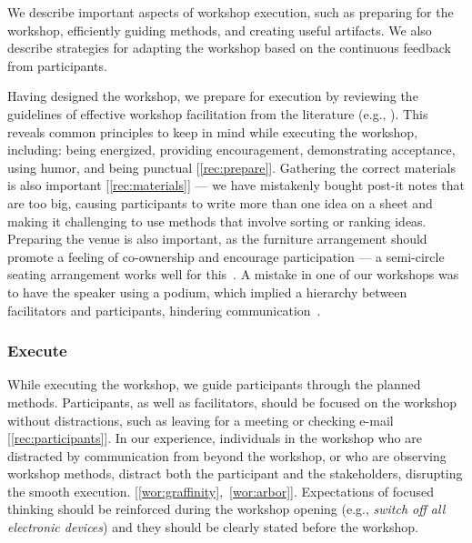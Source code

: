 We describe important aspects of workshop execution, such as preparing for the workshop, efficiently guiding methods, and creating useful artifacts. We also describe strategies for adapting the workshop based on the continuous feedback from participants.

Having designed the workshop, we prepare for execution by reviewing the guidelines of effective workshop facilitation from the literature (e.g., \cite{Brooks-Harris1999,CreativeEducationFoundation2015,Hamilton2016,Macanufo2010,Stanfield2002}). This reveals common principles to keep in mind while executing the workshop, including: being energized, providing encouragement, demonstrating acceptance, using humor, and being punctual [\ref{rec:prepare}].  Gathering the correct materials is also important [\ref{rec:materials}] --- we have mistakenly bought post-it notes that are too big, causing participants to write more than one idea on a sheet and making it challenging to use methods that involve sorting or ranking ideas. Preparing the venue is also important, as the furniture arrangement should promote a feeling of co-ownership and encourage participation --- a semi-circle seating arrangement works well for this~\cite{Vosko1991}. A mistake in one of our workshops was to have the speaker using a podium, which implied a hierarchy between facilitators and participants, hindering communication~\cite{Rogers2016}.

\subsubsection{Execute}

While executing the workshop, we guide participants through the planned methods. Participants, as well as facilitators, should be focused on the workshop without distractions, such as leaving for a meeting or checking e-mail [\ref{rec:participants}]. In our experience, individuals in the workshop who are distracted by communication from beyond the workshop, or who are observing workshop methods, distract both the participant and the stakeholders, disrupting the smooth execution. [\ref{wor:graffinity},~\ref{wor:arbor}]. Expectations of focused thinking should be reinforced during the workshop opening (e.g., \emph{switch off all electronic devices}) and they should be clearly stated before the workshop.


